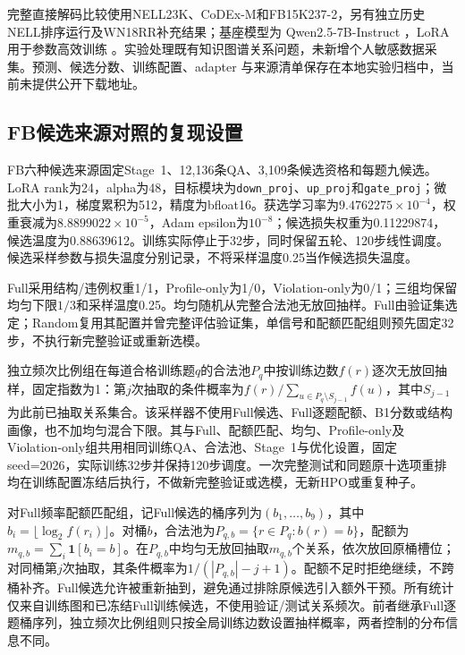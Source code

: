 完整直接解码比较使用NELL23K、CoDEx-M和FB15K237-2，另有独立历史NELL排序运行及WN18RR补充结果；基座模型为 Qwen2.5-7B-Instruct \citep{qwen2024qwen25}，LoRA 用于参数高效训练 \citep{hu2022lora}。实验处理既有知识图谱关系问题，未新增个人敏感数据采集。预测、候选分数、训练配置、adapter 与来源清单保存在本地实验归档中，当前未提供公开下载地址。

\subsection{FB候选来源对照的复现设置}
\label{sec:fb-repro}

FB六种候选来源固定Stage~1、12,136条QA、3,109条候选资格和每题九候选。LoRA rank为24，alpha为48，目标模块为\texttt{down\_proj}、\texttt{up\_proj}和\texttt{gate\_proj}；微批大小为1，梯度累积为512，精度为bfloat16。获选学习率为$9.4762275\times10^{-4}$，权重衰减为$8.8899022\times10^{-5}$，Adam epsilon为$10^{-8}$\citep{kingma2015adam,loshchilov2019decoupled}；候选损失权重为0.11229874，候选温度为0.88639612。训练实际停止于32步，同时保留五轮、120步线性调度。候选采样参数与损失温度分别记录，不将采样温度0.25当作候选损失温度。

Full采用结构/违例权重1/1，Profile-only为1/0，Violation-only为0/1；三组均保留均匀下限$1/3$和采样温度0.25。均匀随机从完整合法池无放回抽样。Full由验证集选定；Random复用其配置并曾完整评估验证集，单信号和配额匹配组则预先固定32步，不执行新完整验证或重新选模。

独立频次比例组在每道合格训练题$q$的合法池$P_q$中按训练边数$f(r)$逐次无放回抽样，固定指数为1：第$j$次抽取的条件概率为$f(r)/\sum_{u\in P_q\setminus S_{j-1}}f(u)$，其中$S_{j-1}$为此前已抽取关系集合。该采样器不使用Full候选、Full逐题配额、B1分数或结构画像，也不加均匀混合下限。其与Full、配额匹配、均匀、Profile-only及Violation-only组共用相同训练QA、合法池、Stage~1与优化设置，固定seed=2026，实际训练32步并保持120步调度。一次完整测试和同题原十选项重排均在训练配置冻结后执行，不做新完整验证或选模，无新HPO或重复种子。

对Full频率配额匹配组，记Full候选的桶序列为$(b_1,\ldots,b_9)$，其中$b_i=\lfloor\log_2 f(r_i)\rfloor$。对桶$b$，合法池为$P_{q,b}=\{r\in P_q:b(r)=b\}$，配额为$m_{q,b}=\sum_i\mathbf{1}[b_i=b]$。在$P_{q,b}$中均匀无放回抽取$m_{q,b}$个关系，依次放回原桶槽位；对同桶第$j$次抽取，其条件概率为$1/(|P_{q,b}|-j+1)$。配额不足时拒绝继续，不跨桶补齐。Full候选允许被重新抽到，避免通过排除原候选引入额外干预。所有统计仅来自训练图和已冻结Full训练候选，不使用验证/测试关系频次。前者继承Full逐题桶序列，独立频次比例组则只按全局训练边数设置抽样概率，两者控制的分布信息不同。

